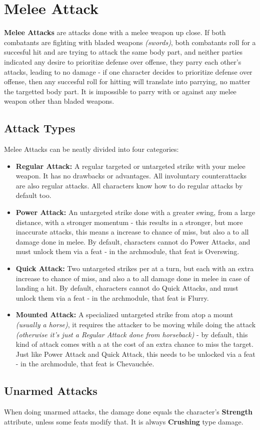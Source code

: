 \section{Melee Attack}
\textbf{Melee Attacks} are attacks done with a melee weapon up close. If both combatants are fighting with bladed weapons \textit{(swords)}, both combatants roll for a succesful hit and are trying to attack the same body part, and neither parties indicated any desire to prioritize defense over offense, they parry each other's attacks, leading to no damage - if one character decides to prioritize defense over offense, then any succesful roll for hitting will translate into parrying, no matter the targetted body part. It is impossible to parry with or against any melee weapon other than bladed weapons.
\subsection{Attack Types}
Melee Attacks can be neatly divided into four categories:
\begin{itemize}
  \item \textbf{Regular Attack:} A regular targeted or untargeted strike with your melee weapon. It has no drawbacks or advantages. All involuntary counterattacks are also regular attacks. All characters know how to do regular attacks by default too.
  \item \textbf{Power Attack:} An untargeted strike done with a greater swing, from a large distance, with a stronger momentum - this results in a stronger, but more inaccurate attacks, this means a  increase to chance of miss, but also a  to all damage done in melee. By default, characters cannot do Power Attacks, and must unlock them via a feat - in the archmodule, that feat is Overswing.
  \item \textbf{Quick Attack:} Two untargeted strikes per at a turn, but each with an extra  increase to chance of miss, and also a  to all damage done in melee in case of landing a hit. By default, characters cannot do Quick Attacks, and must unlock them via a feat - in the archmodule, that feat is Flurry.
  \item \textbf{Mounted Attack:} A specialized untargeted strike from atop a mount \textit{(usually a horse)}, it requires the attacker to be moving while doing the attack \textit{(otherwise it's just a Regular Attack done from horseback)} - by default, this kind of attack comes with a  at the cost of an extra  chance to miss the target. Just like Power Attack and Quick Attack, this needs to be unlocked via a feat - in the archmodule, that feat is Chevauchée.
\end{itemize}
\subsection{Unarmed Attacks}
When doing unarmed attacks, the damage done equals the character's \textbf{Strength} attribute, unless some feats modify that. It is always \textbf{Crushing} type damage.

